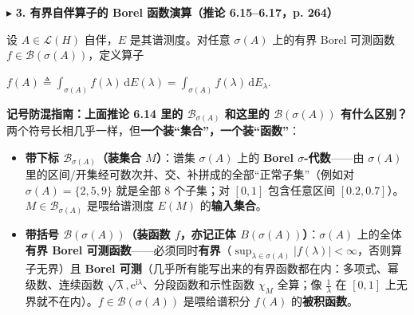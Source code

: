 \documentclass[11pt,a4paper]{article}
\providecommand{\tightlist}{\setlength{\itemsep}{1.8pt}\setlength{\parskip}{0pt}}
\newcommand{\SubSubHeading}[1]{%
  \Needspace{6.5\baselineskip}\vspace{5.5pt}\noindent
  \textcolor{AccentMain}{\scriptsize$\blacktriangleright$}\hspace{4pt}%
  {\small\bfseries\color{AccentMain}#1}\par\nopagebreak[4]\vspace{2.5pt}%
}
\renewenvironment{quote}{%
  \begin{tcolorbox}[
    enhanced,
    breakable,
    colback=AccentSoft!48!white,
    colframe=AccentMain,
    boxrule=0pt,
    leftrule=2.8pt,
    arc=2.5pt,
    left=9pt, right=8pt, top=6pt, bottom=6pt,
    before skip=5.5pt, after skip=5.5pt
  ]\small
}{%
  \end{tcolorbox}%
}
\newcommand{\FitDisplayMath}[1]{%
  \par\vspace{4pt}\noindent
  \begin{adjustbox}{max width=\linewidth, center}
    $\displaystyle #1$
  \end{adjustbox}
  \par\vspace{4pt}%
}
\begin{document}
\SubSubHeading{3. 有界自伴算子的 Borel 函数演算（推论 6.15--6.17，p. 264）}

设 \(A \in \mathcal{L}(H)\) 自伴，\(E\) 是其谱测度。对任意 \(\sigma(A)\) 上的有界 Borel 可测函数 \(f \in \mathcal{B}(\sigma(A))\)，定义算子 
\FitDisplayMath{f(A) \triangleq \int_{\sigma(A)} f(\lambda)\,\mathrm{d}E(\lambda) = \int_{\sigma(A)} f(\lambda)\,\mathrm{d}E_\lambda.}


\begin{quote}
\textbf{记号防混指南：上面推论 6.14 里的 \(\mathcal{B}_{\sigma(A)}\) 和这里的 \(\mathcal{B}(\sigma(A))\) 有什么区别？} 两个符号长相几乎一样，但\textbf{一个装``集合''，一个装``函数''}：

\begin{itemize}
\tightlist
\item
  \textbf{带下标 \(\mathcal{B}_{\sigma(A)}\)（装集合 \(M\)）}：谱集 \(\sigma(A)\) 上的 \textbf{Borel \(\sigma\)-代数}——由 \(\sigma(A)\) 里的区间/开集经可数次并、交、补拼成的全部``正常子集''（例如对 \(\sigma(A)=\{2,5,9\}\) 就是全部 \(8\) 个子集；对 \([0,1]\) 包含任意区间 \([0.2,0.7]\)）。\(M \in \mathcal{B}_{\sigma(A)}\) 是喂给谱测度 \(E(M)\) 的\textbf{输入集合}。
\item
  \textbf{带括号 \(\mathcal{B}(\sigma(A))\)（装函数 \(f\)，亦记正体 \(B(\sigma(A))\)）}：\(\sigma(A)\) 上的全体\textbf{有界 Borel 可测函数}——必须同时\textbf{有界}（\(\sup_{\lambda\in\sigma(A)}|f(\lambda)|<\infty\)，否则算子无界）且 \textbf{Borel 可测}（几乎所有能写出来的有界函数都在内：多项式、幂级数、连续函数 \(\sqrt{\lambda}, \mathrm{e}^{\mathrm{i}\lambda}\)、分段函数和示性函数 \(\chi_M\) 全算；像 \(\frac{1}{\lambda}\) 在 \([0,1]\) 上无界就不在内）。\(f \in \mathcal{B}(\sigma(A))\) 是喂给谱积分 \(f(A)\) 的\textbf{被积函数}。
\end{itemize}
\end{quote}
\end{document}
